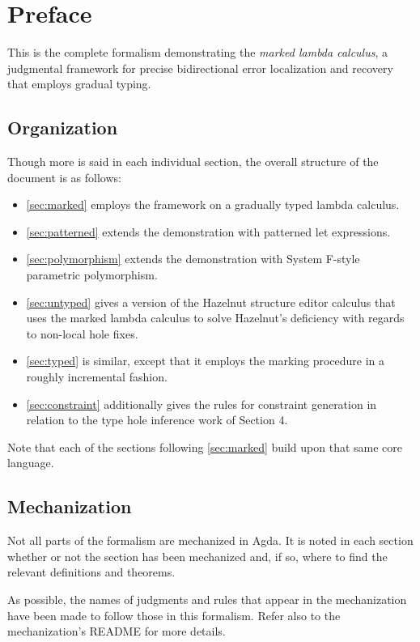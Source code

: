 \documentclass[formalism.tex]{subfiles}
\begin{document}
\section{Preface}
\label{sec:preface}
This is the complete formalism demonstrating the \emph{marked lambda calculus}, a judgmental framework for
precise bidirectional error localization and recovery that employs gradual typing.

\subsection{Organization}
Though more is said in each individual section, the overall structure of the document is as follows:
%
\begin{itemize}
  \item \cref{sec:marked} employs the framework on a gradually typed lambda calculus.

  \item \cref{sec:patterned} extends the demonstration with patterned let expressions.

  \item \cref{sec:polymorphism} extends the demonstration with System F-style parametric
    polymorphism.

  \item \cref{sec:untyped} gives a version of the Hazelnut structure editor calculus that uses the
    marked lambda calculus to solve Hazelnut's deficiency with regards to non-local hole fixes.

  \item \cref{sec:typed} is similar, except that it employs the marking procedure in a roughly
    incremental fashion.

  \item \cref{sec:constraint} additionally gives the rules for constraint generation in relation to
    the type hole inference work of Section 4.
\end{itemize}
%
Note that each of the sections following \cref{sec:marked} build upon that same core language.

\subsection{Mechanization}
Not all parts of the formalism are mechanized in Agda. It is noted in each section whether or not
the section has been mechanized and, if so, where to find the relevant definitions and theorems.

As possible, the names of judgments and rules that appear in the mechanization have been made to
follow those in this formalism. Refer also to the mechanization's README for more details.
\end{document}
